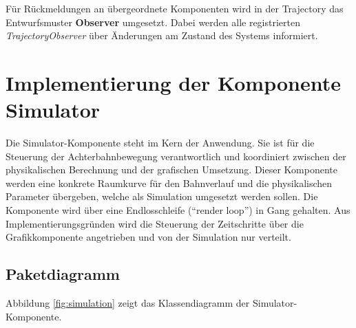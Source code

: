 Für Rückmeldungen an übergeordnete Komponenten wird in der Trajectory das Entwurfsmuster
\textbf{Observer} umgesetzt. Dabei werden alle registrierten \emph{TrajectoryObserver}
über Änderungen am Zustand des Systems informiert.

\section{Implementierung der Komponente Simulator}

Die Simulator-Komponente steht im Kern der Anwendung. Sie ist für die Steuerung der
Achterbahnbewegung verantwortlich und koordiniert zwischen der physikalischen 
Berechnung und der grafischen Umsetzung. Dieser Komponente werden eine konkrete 
Raumkurve für den Bahnverlauf und die physikalischen Parameter übergeben, welche
als Simulation umgesetzt werden sollen. Die Komponente wird über eine 
Endlosschleife (``render loop'') in Gang gehalten. Aus Implementierungsgründen wird
die Steuerung der Zeitschritte über die Grafikkomponente angetrieben und von der
Simulation nur verteilt.

\subsection{Paketdiagramm}
Abbildung \ref{fig:simulation} zeigt das Klassendiagramm der Simulator-Komponente.

